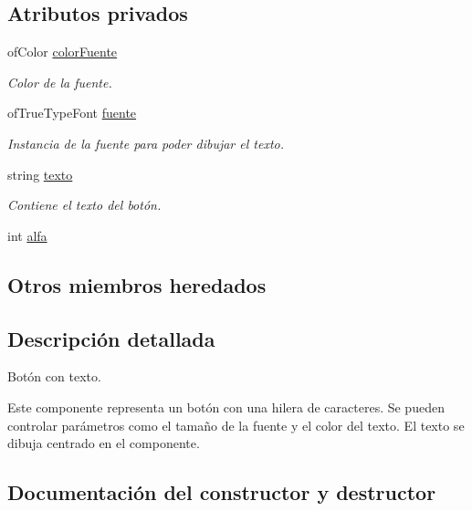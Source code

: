\subsection*{Atributos privados}
\begin{DoxyCompactItemize}
\item 
of\+Color \hyperlink{classboton_simple_a675afe5f4260c740b013c84dff6e60e1}{color\+Fuente}
\begin{DoxyCompactList}\small\item\em Color de la fuente. \end{DoxyCompactList}\item 
of\+True\+Type\+Font \hyperlink{classboton_simple_aca3777162256e66600ed386b887e4414}{fuente}
\begin{DoxyCompactList}\small\item\em Instancia de la fuente para poder dibujar el texto. \end{DoxyCompactList}\item 
string \hyperlink{classboton_simple_a6093d1fa34187d1f74182f59de6459b9}{texto}
\begin{DoxyCompactList}\small\item\em Contiene el texto del botón. \end{DoxyCompactList}\item 
int \hyperlink{classboton_simple_aa3af0794b6ec6ce74ffb15746bb6fc3c}{alfa}
\end{DoxyCompactItemize}
\subsection*{Otros miembros heredados}


\subsection{Descripción detallada}
Botón con texto. 

Este componente representa un botón con una hilera de caracteres. Se pueden controlar parámetros como el tamaño de la fuente y el color del texto. El texto se dibuja centrado en el componente. 

\subsection{Documentación del constructor y destructor}
\hypertarget{classboton_simple_acbcb5c2f8c673c1de738a2282fdca5de}{}
